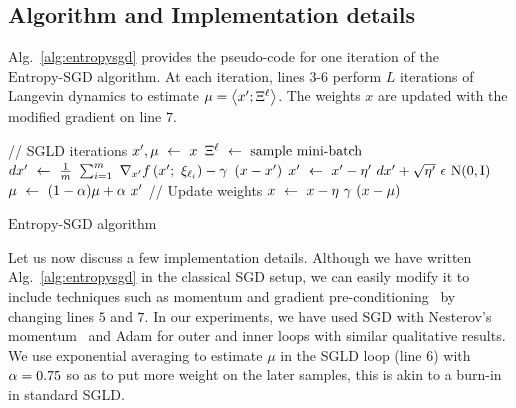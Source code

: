 \documentclass[10pt]{article}
\newcommand{\entropysgd}{\mathrm{Entropy}\textrm{-}\mathrm{SGD}}
\newcommand{\minibatch}[1]{\Xi^{#1}}
\begin{document}
\subsection{Algorithm and Implementation details}
\label{ss:alg}

Alg.~\ref{alg:entropysgd} provides the pseudo-code for one iteration of the $\entropysgd$ algorithm. At each iteration, lines $3$-$6$ perform $L$ iterations of Langevin dynamics to estimate $\mu = \ag{x'; \minibatch{\ell}}$. The weights $x$ are updated with the modified gradient on line $7$.

\begin{center}
\begin{minipage}{0.7 \textwidth}
\IncMargin{0.04in}
\begin{algorithm}[H]

    \small
    \vspace{0.1in}
    \nonl \textrm{// SGLD iterations}\;
    \vspace{0.025in}
    $x', \mu \ \leftarrow\  x$\;
    {
        $\minibatch{\ell} \la \textrm{sample mini-batch}$\;
        \vspace{0.03in}
        $dx' \ \leftarrow\  \frac{1}{m}\ \sum_{i=1}^m\ \nabla_{x'} f\left(x';\ \xi_{\ell_i}\right) - \gamma\ \left(x - x'\right)$\;
        \vspace{0.03in}
        $x' \la x' - \eta'\ dx' + \sqrt{\eta'}\ \e\ \trm{N}(0, \trm{I})$\;
        \vspace{0.03in}
        $\mu \ \leftarrow\  (1-\alpha) \mu + \alpha\ x'$\;
    }
    \vspace{0.1in}
    \nonl \textrm{// Update weights}\;
    \vspace{0.03in}
    $x \la x - \eta\ \g\ (x-\mu)$
    \caption{$\entropysgd$ algorithm}
    \label{alg:entropysgd}
\end{algorithm}
\DecMargin{0.04in}
\end{minipage}
\end{center}

Let us now discuss a few implementation details. Although we have written Alg.~\ref{alg:entropysgd} in the classical SGD setup, we can easily modify it to include techniques such as momentum and gradient pre-conditioning~\citep{duchi2011adaptive} by changing lines $5$ and $7$. In our experiments, we have used SGD with Nesterov's momentum~\citep{sutskever2013importance} and Adam for outer and inner loops with similar qualitative results.
%
We use exponential averaging to estimate $\mu$ in the SGLD loop (line 6) with $\alpha = 0.75$ so as to put more weight on the later samples, this is akin to a burn-in in standard SGLD.
\end{document}
